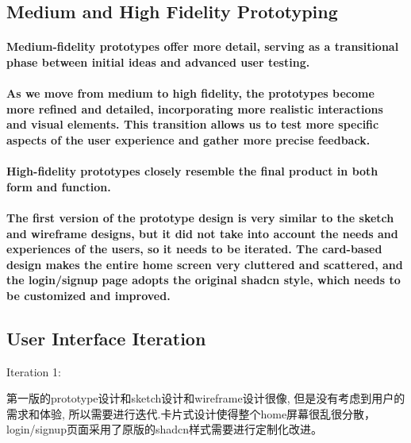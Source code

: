 \subsection{Medium and High Fidelity Prototyping}
\paragraph{Medium-fidelity prototypes offer more detail, serving as a transitional phase between initial ideas and advanced user testing.}

\paragraph{As we move from medium to high fidelity, the prototypes become more refined and detailed, incorporating more realistic interactions and visual elements. This transition allows us to test more specific aspects of the user experience and gather more precise feedback.}

\paragraph{High-fidelity prototypes closely resemble the final product in both form and function.}

\paragraph{The first version of the prototype design is very similar to the sketch and wireframe designs, but it did not take into account the needs and experiences of the users, so it needs to be iterated. The card-based design makes the entire home screen very cluttered and scattered, and the login/signup page adopts the original shadcn style, which needs to be customized and improved.}

\subsection{User Interface Iteration}
Iteration 1:

第一版的prototype设计和sketch设计和wireframe设计很像, 但是没有考虑到用户的需求和体验, 所以需要进行迭代.卡片式设计使得整个home屏幕很乱很分散，login/signup页面采用了原版的shadcn样式需要进行定制化改进。


